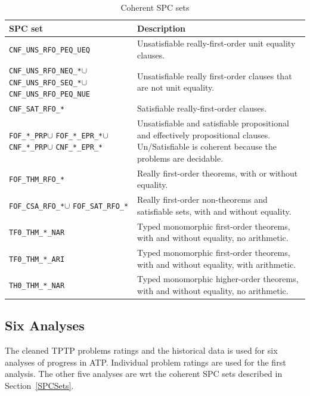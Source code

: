 \documentclass[runningheads]{llncs}
\begin{document}
\begin{table}[h!]
\renewcommand{\arraystretch}{1.5}
\center
\begin{tabular}{p{3.5cm}|p{8.0cm}}
\hline
SPC set & Description \\
\hline
{\tt CNF\_UNS\_RFO\_PEQ\_UEQ} &
Unsatisfiable really-first-order unit equality clauses. \\
{\tt CNF\_UNS\_RFO\_NEQ\_*}\enspace$\cup$ {\tt CNF\_UNS\_RFO\_SEQ\_*}\enspace$\cup$
{\tt CNF\_UNS\_RFO\_PEQ\_NUE} &
Unsatisfiable really first-order clauses that are not unit equality. \\
{\tt CNF\_SAT\_RFO\_*} &
Satisfiable really-first-order clauses. \\
{\tt FOF\_*\_PRP}\enspace$\cup$ {\tt FOF\_*\_EPR\_*}\enspace$\cup$
{\tt CNF\_*\_PRP}\enspace$\cup$ {\tt CNF\_*\_EPR\_*} &
Unsatisfiable and satisfiable propositional and effectively propositional clauses.
Un/Satisfiable is coherent because the problems are decidable. \\
{\tt FOF\_THM\_RFO\_*} &
Really first-order theorems, with or without equality. \\
{\tt FOF\_CSA\_RFO\_*}\enspace$\cup$ {\tt FOF\_SAT\_RFO\_*} &
Really first-order non-theorems and satisfiable sets, with and without equality. \\
{\tt TF0\_THM\_*\_NAR} &
Typed monomorphic first-order theorems, with and without equality, no arithmetic. \\
{\tt TF0\_THM\_*\_ARI} &
Typed monomorphic first-order theorems, with and without equality, with arithmetic. \\
{\tt TH0\_THM\_*\_NAR} &
Typed monomorphic higher-order theorems, with and without equality, no arithmetic. \\
\hline
\end{tabular}
\vspace*{0.5em}
\caption{Coherent SPC sets}
\label{SPCSetsTable}
\end{table}

\subsection{Six Analyses}
\label{AnalysisTypes}

The cleaned TPTP problems ratings and the historical data is used for six analyses of progress
in ATP.
Individual problem ratings are used for the first analysis.
The other five analyses are wrt the coherent SPC sets described in Section~\ref{SPCSets}.
\end{document}
